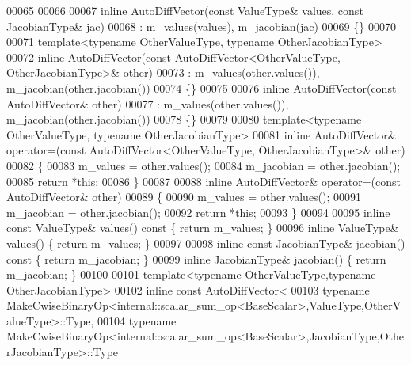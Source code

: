 \begin{DoxyCode}
00065 
00066 
00067     \textcolor{keyword}{inline} AutoDiffVector(\textcolor{keyword}{const} ValueType& values, \textcolor{keyword}{const} JacobianType& jac)
00068       : m\_values(values), m\_jacobian(jac)
00069     \{\}
00070 
00071     \textcolor{keyword}{template}<\textcolor{keyword}{typename} OtherValueType, \textcolor{keyword}{typename} OtherJacobianType>
00072     \textcolor{keyword}{inline} AutoDiffVector(\textcolor{keyword}{const} AutoDiffVector<OtherValueType, OtherJacobianType>& other)
00073       : m\_values(other.values()), m\_jacobian(other.jacobian())
00074     \{\}
00075 
00076     \textcolor{keyword}{inline} AutoDiffVector(\textcolor{keyword}{const} AutoDiffVector& other)
00077       : m\_values(other.values()), m\_jacobian(other.jacobian())
00078     \{\}
00079 
00080     \textcolor{keyword}{template}<\textcolor{keyword}{typename} OtherValueType, \textcolor{keyword}{typename} OtherJacobianType>
00081     \textcolor{keyword}{inline} AutoDiffVector& operator=(\textcolor{keyword}{const} AutoDiffVector<OtherValueType, OtherJacobianType>& other)
00082     \{
00083       m\_values = other.values();
00084       m\_jacobian = other.jacobian();
00085       \textcolor{keywordflow}{return} *\textcolor{keyword}{this};
00086     \}
00087 
00088     \textcolor{keyword}{inline} AutoDiffVector& operator=(\textcolor{keyword}{const} AutoDiffVector& other)
00089     \{
00090       m\_values = other.values();
00091       m\_jacobian = other.jacobian();
00092       \textcolor{keywordflow}{return} *\textcolor{keyword}{this};
00093     \}
00094 
00095     \textcolor{keyword}{inline} \textcolor{keyword}{const} ValueType& values()\textcolor{keyword}{ const }\{ \textcolor{keywordflow}{return} m\_values; \}
00096     \textcolor{keyword}{inline} ValueType& values() \{ \textcolor{keywordflow}{return} m\_values; \}
00097 
00098     \textcolor{keyword}{inline} \textcolor{keyword}{const} JacobianType& jacobian()\textcolor{keyword}{ const }\{ \textcolor{keywordflow}{return} m\_jacobian; \}
00099     \textcolor{keyword}{inline} JacobianType& jacobian() \{ \textcolor{keywordflow}{return} m\_jacobian; \}
00100 
00101     \textcolor{keyword}{template}<\textcolor{keyword}{typename} OtherValueType,\textcolor{keyword}{typename} OtherJacobianType>
00102     \textcolor{keyword}{inline} \textcolor{keyword}{const} AutoDiffVector<
00103       \textcolor{keyword}{typename} MakeCwiseBinaryOp<internal::scalar\_sum\_op<BaseScalar>,ValueType,OtherValueType>::Type,
00104       \textcolor{keyword}{typename} MakeCwiseBinaryOp<internal::scalar\_sum\_op<BaseScalar>,JacobianType,OtherJacobianType>::Type 

\end{DoxyCode}
